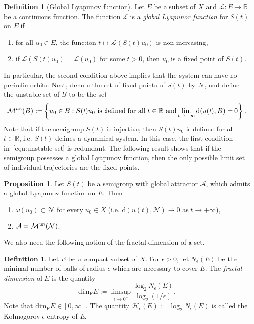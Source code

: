 \documentclass[11pt, reqno]{amsart}
\theoremstyle{definition}
\newtheorem{proposition}[theorem]{Proposition}
\newtheorem{definition}[theorem]{Definition}
\numberwithin{equation}{section}
\newcommand{\bb}{\mathbb}
\begin{document}
\begin{definition}[Global Lyapunov function]\label{def:Lyapunov}
Let $E$ be a subset of $X$ and $\mathcal{L}:E\to \bb{R}$ be a continuous function. The function $\mathcal{L}$ is a \emph{global Lyapunov function} for $S(t)$ on $E$ if
\begin{enumerate}
	\item for all $u_0\in E$, the function $t\mapsto \mathcal{L}(S(t)u_0)$ is non-increasing,
	\item if $\mathcal{L}(S(t)u_0)= \mathcal{L}(u_0)$ for some $t>0$, then $u_0$ is a fixed point of $S(t)$.
\end{enumerate}
\end{definition}
In particular, the second condition above implies that the system can have no periodic orbits.
Next, denote the set of fixed points of $S(t)$ by $\mathcal{N}$, and define the unstable set of $B$ to be the set
\begin{equation}\label{equ:unstable set}
	\mathcal{M}^{\rm{un}}(B):=
	\left\{u_0 \in B: S(t)u_0 \text{ is defined for all $t\in \bb{R}$ and} \lim_{t\to -\infty} \text{d}(u(t),B)=0 \right\}.
\end{equation}
Note that if the semigroup $S(t)$ is injective, then $S(t)u_0$ is defined for all $t\in \bb{R}$, i.e. $S(t)$ defines a dynamical system. In this case, the first condition in~\eqref{equ:unstable set} is redundant. 
The following result shows that if the semigroup possesses a global Lyapunov function, then the only possible limit set of individual trajectories are the fixed points.

\begin{proposition}\label{pro:att lyapunov}
Let $S(t)$ be a semigroup with global attractor $\mathcal{A}$, which admits a global Lyapunov function on $E$. Then
\begin{enumerate}
	\item $\omega(u_0) \subset \mathcal{N}$ for every $u_0 \in X$ (i.e. $\text{d}(u(t), \mathcal{N}) \to 0$ as $t\to +\infty$),
	\item $\mathcal{A}= \mathcal{M}^{\rm{un}}(\mathcal{N})$.
\end{enumerate}
\end{proposition}

We also need the following notion of the fractal dimension of a set.

\begin{definition}\label{def:frac dim}
Let $E$ be a compact subset of $X$. For $\epsilon>0$, let $N_\epsilon(E)$ be the minimal number of balls of radius $\epsilon$ which are necessary to cover $E$. The \emph{fractal dimension} of $E$ is the quantity
\begin{equation*}
    \text{dim}_{\mathrm{F}} E:= \limsup_{\epsilon\to 0^+} \frac{\log_2 N_\epsilon(E)}{\log_2 (1/\epsilon)}.
\end{equation*}
Note that $\text{dim}_{\mathrm{F}} E \in [0,\infty]$. The quantity $\mathcal{H}_\epsilon(E):= \log_2 N_\epsilon(E)$ is called the Kolmogorov $\epsilon$-entropy of $E$.
\end{definition}
\end{document}

